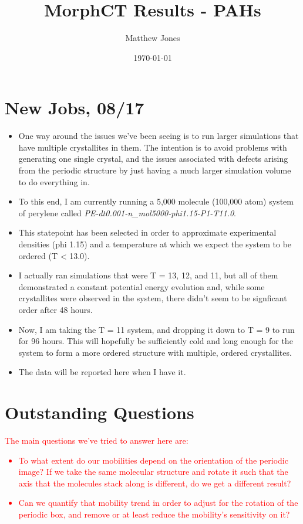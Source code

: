 \documentclass[12pt]{article}
\title{MorphCT Results - PAHs}
\author{Matthew Jones}
\date{\today}
\begin{document}
\maketitle

\section{New Jobs, 08/17}

\begin{itemize}
    \item{One way around the issues we've been seeing is to run larger simulations that have multiple crystallites in them.
        The intention is to avoid problems with generating one single crystal, and the issues associated with defects arising from the periodic structure by just having a much larger simulation volume to do everything in.}
    \item{To this end, I am currently running a 5,000 molecule (100,000 atom) system of perylene called \textit{PE-dt0.001-n\_mol5000-phi1.15-P1-T11.0}.}
    \item{This statepoint has been selected in order to approximate experimental densities (phi 1.15) and a temperature at which we expect the system to be ordered (T < 13.0).}
    \item{I actually ran simulations that were T = 13, 12, and 11, but all of them demonstrated a constant potential energy evolution and, while some crystallites were observed in the system, there didn't seem to be signficant order after 48 hours.}
    \item{Now, I am taking the T = 11 system, and dropping it down to T = 9 to run for 96 hours. This will hopefully be sufficiently cold and long enough for the system to form a more ordered structure with multiple, ordered crystallites.}
    \item{The data will be reported here when I have it.}
\end{itemize}

\newpage


\section{Outstanding Questions}

\textcolor{red}{The main questions we've tried to answer here are:
    \begin{itemize}
        \item{To what extent do our mobilities depend on the orientation of the periodic image? If we take the same molecular structure and rotate it such that the axis that the molecules stack along is different, do we get a different result?}
        \item{Can we quantify that mobility trend in order to adjust for the rotation of the periodic box, and remove or at least reduce the mobility's sensitivity on it?}
    \end{itemize}
}
\end{document}
